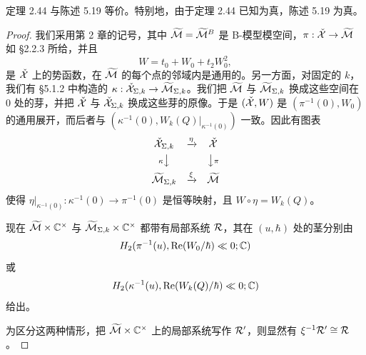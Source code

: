 \begin{corollary}
定理 2.44 与陈述 5.19 等价。特别地，由于定理 2.44 已知为真，陈述 5.19 为真。
\end{corollary}

\begin{proof}
我们采用第 2 章的记号，其中 $\widetilde{\mathcal{M}}=\widetilde{\mathcal{M}}^B$ 是 B-模型模空间，$\pi:\check{\mathcal{X}}\to\widetilde{\mathcal{M}}$ 如 §2.2.3 所给，并且
\[
  W=t_0+W_0+t_2W_0^2,
\]
是 $\check{\mathcal{X}}$ 上的势函数，在 $\widetilde{\mathcal{M}}$ 的每个点的邻域内是通用的。另一方面，对固定的 $k$，我们有 §5.1.2 中构造的 $\kappa:\check{\mathcal{X}}_{\Sigma,k}\to\widetilde{\mathcal{M}}_{\Sigma,k}$。我们把 $\widetilde{\mathcal{M}}$ 与 $\widetilde{\mathcal{M}}_{\Sigma,k}$ 换成这些空间在 $0$ 处的芽，并把 $\check{\mathcal{X}}$ 与 $\check{\mathcal{X}}_{\Sigma,k}$ 换成这些芽的原像。于是 $(\check{\mathcal{X}},W)$ 是 $(\pi^{-1}(0),W_0)$ 的通用展开，而后者与 $(\kappa^{-1}(0),W_k(Q)|_{\kappa^{-1}(0)})$ 一致。因此有图表
\[
  \begin{array}{ccc}
    \check{\mathcal{X}}_{\Sigma,k} & \xrightarrow{\eta} & \check{\mathcal{X}}\\[4pt]
    {\scriptstyle\kappa}\big\downarrow & & \big\downarrow{\scriptstyle\pi}\\[4pt]
    \widetilde{\mathcal{M}}_{\Sigma,k} & \xrightarrow{\xi} & \widetilde{\mathcal{M}}
  \end{array}
\]
使得 $\eta|_{\kappa^{-1}(0)}:\kappa^{-1}(0)\to\pi^{-1}(0)$ 是恒等映射，且 $W\circ\eta=W_k(Q)$。

现在 $\widetilde{\mathcal{M}}\times\mathbb{C}^{\times}$ 与 $\widetilde{\mathcal{M}}_{\Sigma,k}\times\mathbb{C}^{\times}$ 都带有局部系统 $\mathcal{R}$，其在 $(u,\hbar)$ 处的茎分别由
\[
  H_2(\pi^{-1}(u),\operatorname{Re}(W_0/\hbar)\ll 0;\mathbb{C})
\]
或
\[
  H_2(\kappa^{-1}(u),\operatorname{Re}(W_k(Q)/\hbar)\ll 0;\mathbb{C})
\]
给出。

为区分这两种情形，把 $\widetilde{\mathcal{M}}\times\mathbb{C}^{\times}$ 上的局部系统写作 $\mathcal{R}'$，则显然有 $\xi^{-1}\mathcal{R}'\cong\mathcal{R}$。


\end{proof}
